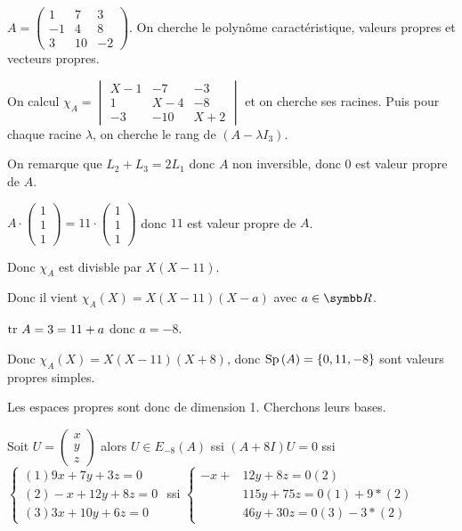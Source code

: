 \begin{exemple}
    $A = \begin{pmatrix}
        1 & 7 & 3 \\
        -1 & 4 & 8 \\
        3 & 10 & -2
    \end{pmatrix}$. On cherche le polynôme caractéristique, valeurs propres et vecteurs propres. 


    \svspace On calcul $\chi_A = \begin{vmatrix}
        X - 1 & -7 & -3 \\
        1 & X - 4 & -8 \\
        -3 & -10 & X + 2
    \end{vmatrix}$ et on cherche ses racines. Puis pour chaque racine $\lambda$, on cherche le rang de 
    $(A - \lambda I_3)$.


    \svspace On remarque que $L_2 + L_3 = 2 L_1$ donc $A$ non inversible, donc $0$ est valeur propre de $A$. 

    $A \cdot \begin{pmatrix}
        1 \\
        1 \\
        1
    \end{pmatrix} = 11 \cdot \begin{pmatrix}
        1 \\
        1 \\
        1
    \end{pmatrix}$ donc $11$ est valeur propre de $A$.

    Donc $\chi_A$ est divisble par $X(X - 11)$.

    Donc il vient $\chi_A(X) = X(X - 11)(X - a)$ avec $a \in \R$.

    $\operatorname{tr} \, A = 3 = 11 + a$ donc $a = -8$.

    Donc $\chi_A(X) = X(X - 11)(X + 8)$, donc $\operatorname{Sp} \,(A) = \{0, 11, -8\}$ sont valeurs propres simples.

    Les espaces propres sont donc de dimension 1. Cherchons leurs bases. 

    Soit $U = \begin{pmatrix}
        x \\
        y \\
        z   
    \end{pmatrix}$ alors $U \in E_{-8}(A)$ ssi $(A + 8I) U = 0$ ssi $\begin{cases}
        (1) 9x + 7y + 3z = 0 \\
        (2) -x + 12y + 8z = 0 \\
        (3) 3x + 10y + 6z = 0
    \end{cases}$ ssi $\begin{cases}
        -x +  & 12y + 8z = 0 (2)\\
        & 115y + 75 z = 0 (1) + 9*(2) \\
        & 46 y + 30 z = 0 (3) - 3*(2)
    \end{cases}$ 
    

\end{exemple}
